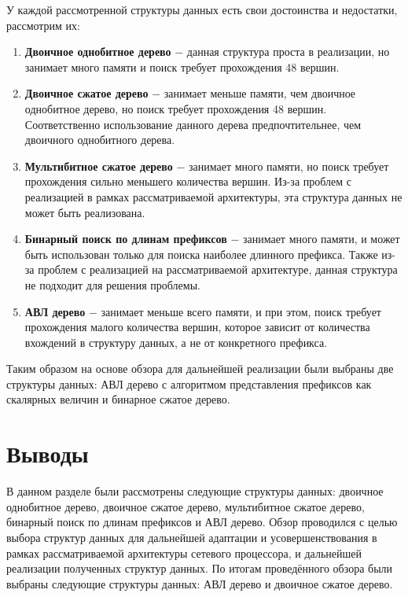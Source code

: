 \documentclass[a4paper, 12pt, titlepage, finall]{extreport}
\begin{document}
        У каждой рассмотренной структуры данных есть свои достоинства и недостатки, рассмотрим их:
        \begin{enumerate}
            \item \textbf{Двоичное однобитное дерево} $-$ данная структура проста в реализации, но занимает много памяти и поиск требует прохождения 48 вершин.
            \item \textbf{Двоичное сжатое дерево} $-$ занимает меньше памяти, чем двоичное однобитное дерево, но поиск требует прохождения 48 вершин. 
                Соответственно использование данного дерева предпочтительнее, чем двоичного однобитного дерева.
            \item \textbf{Мультибитное сжатое дерево} $-$ занимает много памяти, но поиск требует прохождения сильно меньшего количества вершин. 
                Из-за проблем с реализацией в рамках рассматриваемой архитектуры, эта структура данных не может быть реализована.
            \item \textbf{Бинарный поиск по длинам префиксов} $-$ занимает много памяти, и может быть использован только для поиска наиболее длинного префикса.
                Также из-за проблем с реализацией на рассматриваемой архитектуре, данная структура не подходит для решения проблемы.
            \item \textbf{АВЛ дерево} $-$ занимает меньше всего памяти, и при этом, поиск требует прохождения малого количества вершин,
                которое зависит от количества вхождений в структуру данных, а не от конкретного префикса.
        \end{enumerate}

        Таким образом на основе обзора для дальнейшей реализации были выбраны две структуры данных: 
        АВЛ дерево с алгоритмом представления префиксов как скалярных величин и бинарное сжатое дерево.
    \section{Выводы}
        В данном разделе были рассмотрены следующие структуры данных: двоичное однобитное дерево, двоичное сжатое дерево, мультибитное сжатое дерево, бинарный поиск по длинам префиксов и АВЛ дерево.
        Обзор проводился с целью выбора структур данных для дальнейшей адаптации и усовершенствования в рамках рассматриваемой архитектуры сетевого процессора, 
        и дальнейшей реализации полученных структур данных. По итогам проведённого обзора были выбраны следующие структуры данных: АВЛ дерево и двоичное сжатое дерево.
    
\end{document}
